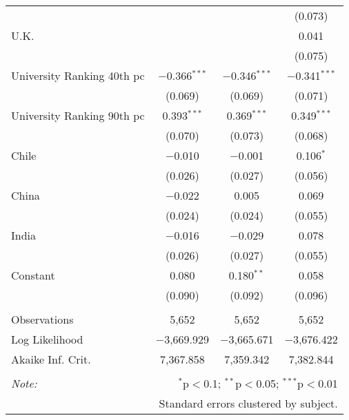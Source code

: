 \begin{table}[!htbp]
\begin{tabular}{@{\extracolsep{5pt}}lccc}
  &  &  & (0.073) \\ 
  U.K. &  &  & 0.041 \\ 
  &  &  & (0.075) \\ 
  University Ranking 40th pc & $-$0.366$^{***}$ & $-$0.346$^{***}$ & $-$0.341$^{***}$ \\ 
  & (0.069) & (0.069) & (0.071) \\ 
  University Ranking 90th pc & 0.393$^{***}$ & 0.369$^{***}$ & 0.349$^{***}$ \\ 
  & (0.070) & (0.073) & (0.068) \\ 
  Chile & $-$0.010 & $-$0.001 & 0.106$^{*}$ \\ 
  & (0.026) & (0.027) & (0.056) \\ 
  China & $-$0.022 & 0.005 & 0.069 \\ 
  & (0.024) & (0.024) & (0.055) \\ 
  India & $-$0.016 & $-$0.029 & 0.078 \\ 
  & (0.026) & (0.027) & (0.055) \\ 
  Constant & 0.080 & 0.180$^{**}$ & 0.058 \\ 
  & (0.090) & (0.092) & (0.096) \\ 
 \hline \\[-1.8ex] 
Observations & 5,652 & 5,652 & 5,652 \\ 
Log Likelihood & $-$3,669.929 & $-$3,665.671 & $-$3,676.422 \\ 
Akaike Inf. Crit. & 7,367.858 & 7,359.342 & 7,382.844 \\ 
\hline 
\hline \\[-1.8ex] 
\textit{Note:}  & \multicolumn{3}{r}{$^{*}$p$<$0.1; $^{**}$p$<$0.05; $^{***}$p$<$0.01} \\ 
 & \multicolumn{3}{r}{Standard errors clustered by subject.} \\ 
\end{tabular} 
\end{table} 
